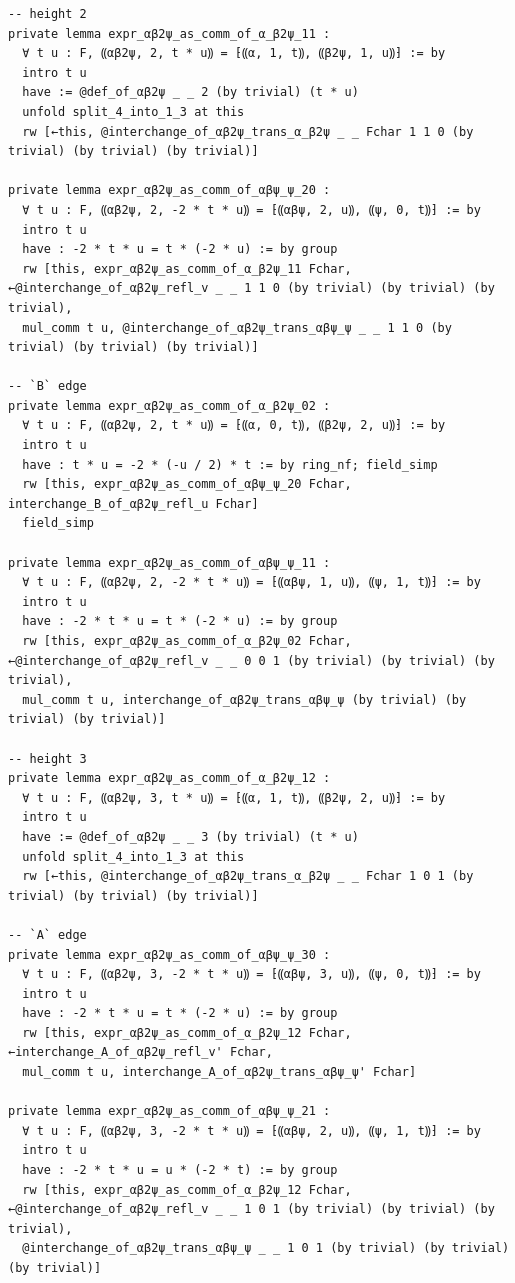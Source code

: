 \documentclass[10pt,a4paper]{article}
\begin{document}
\begin{Verbatim}
-- height 2
private lemma expr_αβ2ψ_as_comm_of_α_β2ψ_11 :
  ∀ t u : F, ⸨αβ2ψ, 2, t * u⸩ = ⁅⸨α, 1, t⸩, ⸨β2ψ, 1, u⸩⁆ := by
  intro t u
  have := @def_of_αβ2ψ _ _ 2 (by trivial) (t * u)
  unfold split_4_into_1_3 at this
  rw [←this, @interchange_of_αβ2ψ_trans_α_β2ψ _ _ Fchar 1 1 0 (by trivial) (by trivial) (by trivial)]

private lemma expr_αβ2ψ_as_comm_of_αβψ_ψ_20 :
  ∀ t u : F, ⸨αβ2ψ, 2, -2 * t * u⸩ = ⁅⸨αβψ, 2, u⸩, ⸨ψ, 0, t⸩⁆ := by
  intro t u
  have : -2 * t * u = t * (-2 * u) := by group
  rw [this, expr_αβ2ψ_as_comm_of_α_β2ψ_11 Fchar, ←@interchange_of_αβ2ψ_refl_v _ _ 1 1 0 (by trivial) (by trivial) (by trivial),
  mul_comm t u, @interchange_of_αβ2ψ_trans_αβψ_ψ _ _ 1 1 0 (by trivial) (by trivial) (by trivial)]

-- `B` edge
private lemma expr_αβ2ψ_as_comm_of_α_β2ψ_02 :
  ∀ t u : F, ⸨αβ2ψ, 2, t * u⸩ = ⁅⸨α, 0, t⸩, ⸨β2ψ, 2, u⸩⁆ := by
  intro t u
  have : t * u = -2 * (-u / 2) * t := by ring_nf; field_simp
  rw [this, expr_αβ2ψ_as_comm_of_αβψ_ψ_20 Fchar, interchange_B_of_αβ2ψ_refl_u Fchar]
  field_simp

private lemma expr_αβ2ψ_as_comm_of_αβψ_ψ_11 :
  ∀ t u : F, ⸨αβ2ψ, 2, -2 * t * u⸩ = ⁅⸨αβψ, 1, u⸩, ⸨ψ, 1, t⸩⁆ := by
  intro t u
  have : -2 * t * u = t * (-2 * u) := by group
  rw [this, expr_αβ2ψ_as_comm_of_α_β2ψ_02 Fchar, ←@interchange_of_αβ2ψ_refl_v _ _ 0 0 1 (by trivial) (by trivial) (by trivial),
  mul_comm t u, interchange_of_αβ2ψ_trans_αβψ_ψ (by trivial) (by trivial) (by trivial)]

-- height 3
private lemma expr_αβ2ψ_as_comm_of_α_β2ψ_12 :
  ∀ t u : F, ⸨αβ2ψ, 3, t * u⸩ = ⁅⸨α, 1, t⸩, ⸨β2ψ, 2, u⸩⁆ := by
  intro t u
  have := @def_of_αβ2ψ _ _ 3 (by trivial) (t * u)
  unfold split_4_into_1_3 at this
  rw [←this, @interchange_of_αβ2ψ_trans_α_β2ψ _ _ Fchar 1 0 1 (by trivial) (by trivial) (by trivial)]

-- `A` edge
private lemma expr_αβ2ψ_as_comm_of_αβψ_ψ_30 :
  ∀ t u : F, ⸨αβ2ψ, 3, -2 * t * u⸩ = ⁅⸨αβψ, 3, u⸩, ⸨ψ, 0, t⸩⁆ := by
  intro t u
  have : -2 * t * u = t * (-2 * u) := by group
  rw [this, expr_αβ2ψ_as_comm_of_α_β2ψ_12 Fchar, ←interchange_A_of_αβ2ψ_refl_v' Fchar,
  mul_comm t u, interchange_A_of_αβ2ψ_trans_αβψ_ψ' Fchar]

private lemma expr_αβ2ψ_as_comm_of_αβψ_ψ_21 :
  ∀ t u : F, ⸨αβ2ψ, 3, -2 * t * u⸩ = ⁅⸨αβψ, 2, u⸩, ⸨ψ, 1, t⸩⁆ := by
  intro t u
  have : -2 * t * u = u * (-2 * t) := by group
  rw [this, expr_αβ2ψ_as_comm_of_α_β2ψ_12 Fchar, ←@interchange_of_αβ2ψ_refl_v _ _ 1 0 1 (by trivial) (by trivial) (by trivial),
  @interchange_of_αβ2ψ_trans_αβψ_ψ _ _ 1 0 1 (by trivial) (by trivial) (by trivial)]


\end{Verbatim}
\end{document}
